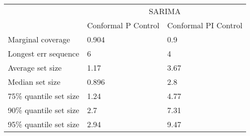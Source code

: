 \begin{tabular}{lll}
\toprule
& \multicolumn{2}{c}{SARIMA} \\
& Conformal P Control & Conformal PI Control \\
\midrule
Marginal coverage & 0.904 & 0.9 \\
Longest err sequence & 6 & 4 \\
Average set size & 1.17 & 3.67 \\
Median set size & 0.896 & 2.8 \\
75\% quantile set size & 1.24 & 4.77 \\
90\% quantile set size & 2.7 & 7.31 \\
95\% quantile set size & 2.94 & 9.47 \\
\bottomrule
\end{tabular}
